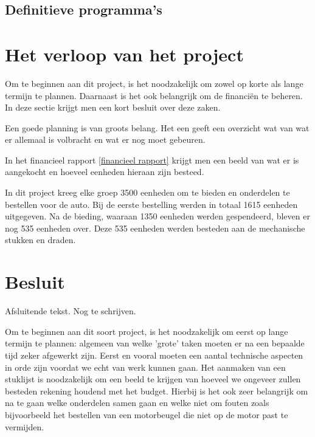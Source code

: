 \documentclass[a4paper,twoside,kulak]{kulakreport} %
\begin{document}
\subsection{Definitieve programma's}



\section{Het verloop van het project} %
Om te beginnen aan dit project, is het noodzakelijk om zowel op korte als lange termijn te plannen. Daarnaast is het ook belangrijk om de financiën te beheren. In deze sectie krijgt men een kort besluit over deze zaken.

Een goede planning is van groots belang. Het een geeft een overzicht wat van wat er allemaal is volbracht en wat er nog moet gebeuren.%

In het financieel rapport \ref{financieel rapport} krijgt men een beeld van wat er is aangekocht en hoeveel eenheden hieraan zijn besteed. 

In dit project kreeg elke groep 3500 eenheden om te bieden en onderdelen te bestellen voor de auto. Bij de eerste bestelling werden in totaal 1615 eenheden uitgegeven. Na de bieding, waaraan 1350 eenheden werden gespendeerd, bleven er nog 535 eenheden over. Deze 535 eenheden werden besteden aan de mechanische stukken en draden.



\section{Besluit}

Afsluitende tekst. Nog te schrijven.




Om te beginnen aan dit soort project, is het noodzakelijk om eerst op lange termijn te plannen: algemeen van welke 'grote' taken moeten er na een bepaalde tijd zeker afgewerkt zijn. Eerst en vooral moeten een aantal technische aspecten in orde zijn voordat we echt van werk kunnen gaan. Het aanmaken van een stuklijst is noodzakelijk om een beeld te krijgen van hoeveel we ongeveer zullen besteden rekening houdend met het budget. Hierbij is het ook zeer belangrijk om na te gaan welke onderdelen samen gaan en welke niet om fouten zoals bijvoorbeeld het bestellen van een motorbeugel die niet op de motor past te vermijden.
\end{document}
